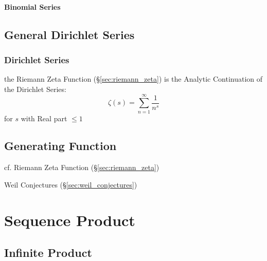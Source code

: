 \paragraph{Binomial Series}\label{sec:binomial_series}\hfill



\subsection{General Dirichlet Series}\label{sec:general_dirichlet}




\subsubsection{Dirichlet Series}\label{sec:dirichlet_series}

the Riemann Zeta Function (\S\ref{sec:riemann_zeta}) is the Analytic
Continuation of the Dirichlet Series:
\[
  \zeta(s) = \sum_{n=1}^\infty \frac{1}{n^s}
\]
for $s$ with Real part $\leq 1$



\subsection{Generating Function}\label{sec:generating_function}

cf. Riemann Zeta Function (\S\ref{sec:riemann_zeta})

\fist Weil Conjectures (\S\ref{sec:weil_conjectures})



\section{Sequence Product}\label{sec:sequence_product}

\subsection{Infinite Product}\label{sec:infinite_product}

